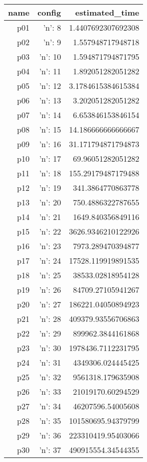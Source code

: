 \documentclass{article}
\begin{document}
                            \begin{center}
                            \scriptsize
                            \begin{tabular}{r|r|r}
                            name & config & estimated\_time\\\midrule
                              p01&{'n': 8}&1.4407692307692308\\
  p02&{'n': 9}&1.557948717948718\\
  p03&{'n': 10}&1.594871794871795\\
  p04&{'n': 11}&1.892051282051282\\
  p05&{'n': 12}&3.1784615384615384\\
  p06&{'n': 13}&3.202051282051282\\
  p07&{'n': 14}&6.653846153846154\\
  p08&{'n': 15}&14.186666666666667\\
  p09&{'n': 16}&31.171794871794873\\
  p10&{'n': 17}&69.96051282051282\\
  p11&{'n': 18}&155.29179487179488\\
  p12&{'n': 19}&341.3864770863778\\
  p13&{'n': 20}&750.4886322787655\\
  p14&{'n': 21}&1649.840356849116\\
  p15&{'n': 22}&3626.9346210122926\\
  p16&{'n': 23}&7973.289470394877\\
  p17&{'n': 24}&17528.119919891535\\
  p18&{'n': 25}&38533.02818954128\\
  p19&{'n': 26}&84709.27105941267\\
  p20&{'n': 27}&186221.04050894923\\
  p21&{'n': 28}&409379.93556706863\\
  p22&{'n': 29}&899962.3844161868\\
  p23&{'n': 30}&1978436.7112231795\\
  p24&{'n': 31}&4349306.024445425\\
  p25&{'n': 32}&9561318.179635908\\
  p26&{'n': 33}&21019170.60294529\\
  p27&{'n': 34}&46207596.54005608\\
  p28&{'n': 35}&101580695.94379799\\
  p29&{'n': 36}&223310419.95403066\\
  p30&{'n': 37}&490915554.34544355
                            \end{tabular}
                            \end{center}
                    
\end{document}
